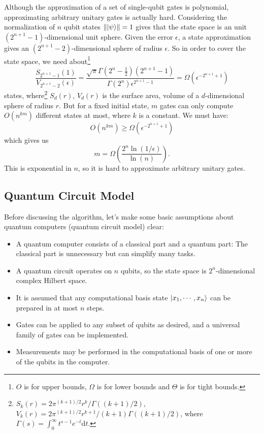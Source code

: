 \documentclass[a4paper,10pt]{article}
\numberwithin{equation}{subsection}
\begin{document}
\vspace{.5cm}
Although the approximation of a set of single-qubit gates is polynomial, approximating arbitrary unitary gates is actually hard. Considering the normalization of $n$ qubit states $\left\|\ket{\psi}\right\|=1$ gives that the state space is an unit $(2^{n+1}-1)$-dimensional unit sphere. Given the error $\epsilon$, a state approximation gives an $(2^{n+1}-2)$-dimensional sphere of radius $\epsilon$. So in order to cover the state space, we need about\footnote{$O$ is for upper bounds, $\Omega$ is for lower bounds and $\Theta$ is for tight bounds. }
\begin{equation}
    \frac{S_{2^{n+1}-1}(1)}{V_{2^{n+1}-2}(\epsilon)} = \frac{\sqrt{\pi}\Gamma(2^{n}-\frac{1}{2})(2^{n+1}-1)}{\Gamma(2^{n})\epsilon^{2^{n+1}-1}}=\Omega(\epsilon^{-2^{n+1}+1})
\end{equation}
states, where\footnote{$S_{k}(r)=2\pi^{(k+1)/2}r^{k}/\Gamma((k+1)/2)$, $V_{k}(r)=2\pi^{(k+1)/2}r^{k+1}/(k+1)\Gamma((k+1)/2)$, where $\Gamma(s)=\int_{0}^{\infty}t^{s-1}e^{-t}\mathrm{d}t$.} $S_{d}(r)$, $V_{d}(r)$ is the surface area, volume of a $d$-dimensional sphere of radius $r$. But for a fixed initial state, $m$ gates can only compute $O(n^{km})$ different states at most, where $k$ is a constant. We must have:
\begin{equation}
    O(n^{km})\geq\Omega(\epsilon^{-2^{n+1}+1})
\end{equation}
which gives us
\begin{equation}
    m = \Omega\left(\frac{2^{n}\ln(1/\epsilon)}{\ln(n)}\right).
\end{equation}
This is exponential in $n$, so it is hard to approximate arbitrary unitary gates.



\subsection{Quantum Circuit Model}

Before discussing the algorithm, let's make some basic assumptions about quantum computers (quantum circuit model) clear:
\begin{itemize}
    \item A quantum computer consists of a classical part and a quantum part: The classical part is unnecessary but can simplify many tasks.
    \item A quantum circuit operates on $n$ qubits, so the state space is $2^{n}$-dimensional complex Hilbert space.
    \item It is assumed that any computational basis state $\ket{x_{1},\cdots,x_{n}}$ can be prepared in at most $n$ steps.
    \item Gates can be applied to any subset of qubits as desired, and a universal family of gates can be implemented.
    \item Measurements may be performed in the computational basis of one or more of the qubits in the computer.
\end{itemize}
\end{document}
